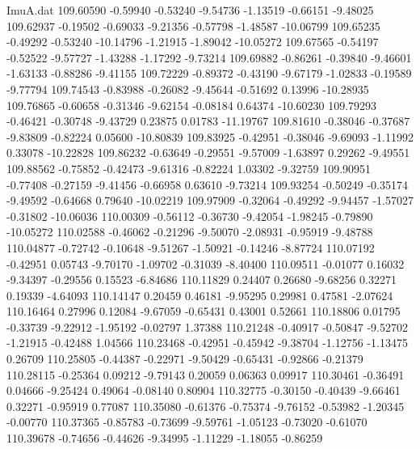 \begin{filecontents}{ImuA.dat}
 109.60590   -0.59940   -0.53240   -9.54736   -1.13519   -0.66151   -9.48025
 109.62937   -0.19502   -0.69033   -9.21356   -0.57798   -1.48587  -10.06799
 109.65235   -0.49292   -0.53240  -10.14796   -1.21915   -1.89042  -10.05272
 109.67565   -0.54197   -0.52522   -9.57727   -1.43288   -1.17292   -9.73214
 109.69882   -0.86261   -0.39840   -9.46601   -1.63133   -0.88286   -9.41155
 109.72229   -0.89372   -0.43190   -9.67179   -1.02833   -0.19589   -9.77794
 109.74543   -0.83988   -0.26082   -9.45644   -0.51692    0.13996  -10.28935
 109.76865   -0.60658   -0.31346   -9.62154   -0.08184    0.64374  -10.60230
 109.79293   -0.46421   -0.30748   -9.43729    0.23875    0.01783  -11.19767
 109.81610   -0.38046   -0.37687   -9.83809   -0.82224    0.05600  -10.80839
 109.83925   -0.42951   -0.38046   -9.69093   -1.11992    0.33078  -10.22828
 109.86232   -0.63649   -0.29551   -9.57009   -1.63897    0.29262   -9.49551
 109.88562   -0.75852   -0.42473   -9.61316   -0.82224    1.03302   -9.32759
 109.90951   -0.77408   -0.27159   -9.41456   -0.66958    0.63610   -9.73214
 109.93254   -0.50249   -0.35174   -9.49592   -0.64668    0.79640  -10.02219
 109.97909   -0.32064   -0.49292   -9.94457   -1.57027   -0.31802  -10.06036
 110.00309   -0.56112   -0.36730   -9.42054   -1.98245   -0.79890  -10.05272
 110.02588   -0.46062   -0.21296   -9.50070   -2.08931   -0.95919   -9.48788
 110.04877   -0.72742   -0.10648   -9.51267   -1.50921   -0.14246   -8.87724
 110.07192   -0.42951    0.05743   -9.70170   -1.09702   -0.31039   -8.40400
 110.09511   -0.01077    0.16032   -9.34397   -0.29556    0.15523   -6.84686
 110.11829    0.24407    0.26680   -9.68256    0.32271    0.19339   -4.64093
 110.14147    0.20459    0.46181   -9.95295    0.29981    0.47581   -2.07624
 110.16464    0.27996    0.12084   -9.67059   -0.65431    0.43001    0.52661
 110.18806    0.01795   -0.33739   -9.22912   -1.95192   -0.02797    1.37388
 110.21248   -0.40917   -0.50847   -9.52702   -1.21915   -0.42488    1.04566
 110.23468   -0.42951   -0.45942   -9.38704   -1.12756   -1.13475    0.26709
 110.25805   -0.44387   -0.22971   -9.50429   -0.65431   -0.92866   -0.21379
 110.28115   -0.25364    0.09212   -9.79143    0.20059    0.06363    0.09917
 110.30461   -0.36491    0.04666   -9.25424    0.49064   -0.08140    0.80904
 110.32775   -0.30150   -0.40439   -9.66461    0.32271   -0.95919    0.77087
 110.35080   -0.61376   -0.75374   -9.76152   -0.53982   -1.20345   -0.00770
 110.37365   -0.85783   -0.73699   -9.59761   -1.05123   -0.73020   -0.61070
 110.39678   -0.74656   -0.44626   -9.34995   -1.11229   -1.18055   -0.86259

\end{filecontents}
